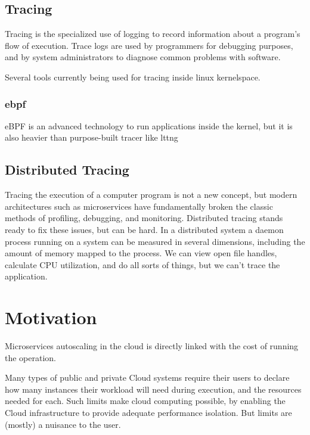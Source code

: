 \documentclass[conference]{IEEEtran}
\begin{document}
\subsection{Tracing}

Tracing is the specialized use of logging to record information about a program’s flow of execution.
Trace logs are used by programmers for debugging purposes, and by system administrators to diagnose common problems with software.

Several tools currently being used for tracing inside linux kernelspace. 

\subsubsection{ebpf}

eBPF is an advanced technology to run applications inside the kernel, but it is also heavier than purpose-built tracer like lttng

\subsection{Distributed Tracing}
                                                                                                                     Tracing the execution of a computer program is not a new concept, but modern architectures such as microservices have fundamentally broken the classic methods of profiling, debugging, and monitoring. Distributed tracing stands ready to fix these issues, but can be hard.
                                                                                                                     In a distributed system a daemon process running on a system can be measured in several dimensions, including the amount of memory mapped to the process. We can view open file handles, calculate CPU utilization, and do all sorts of things, but we can't trace the application.

\section{Motivation}
Microservices autoscaling in the cloud is directly linked with the cost of running the operation.

Many types of public and private Cloud systems require their users to declare how many instances their workload will need during execution, and the resources needed for each. Such limits make cloud computing possible, by enabling the Cloud infrastructure to provide adequate performance isolation. But limits are (mostly) a nuisance to the user.
\end{document}

